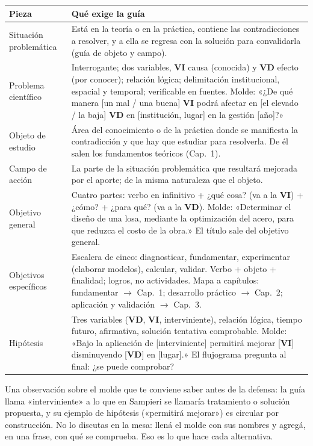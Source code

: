 \documentclass[11pt,a4paper]{article}
\newcommand{\vi}{\textbf{VI}}
\newcommand{\vd}{\textbf{VD}}
\newcommand{\molde}[1]{\textcolor{blue!60!black}{\small #1}}
\begin{document}
\begin{longtable}{L{3.4cm}L{12.4cm}}
\toprule
\textbf{Pieza} & \textbf{Qué exige la guía} \\
\midrule
\endhead
Situación problemática & Está en la teoría o en la práctica, contiene las contradicciones a resolver, y a ella se regresa con la solución para convalidarla (guía de objeto y campo). \\
Problema científico & Interrogante; dos variables, \vi{} causa (conocida) y \vd{} efecto (por conocer); relación lógica; delimitación institucional, espacial y temporal; verificable en fuentes. Molde: \molde{«¿De qué manera [un mal / una buena] \vi{} podrá afectar en [el elevado / la baja] \vd{} en [institución, lugar] en la gestión [año]?»} \\
Objeto de estudio & Área del conocimiento o de la práctica donde se manifiesta la contradicción y que hay que estudiar para resolverla. De él salen los fundamentos teóricos (Cap.~1). \\
Campo de acción & La parte de la situación problemática que resultará mejorada por el aporte; de la misma naturaleza que el objeto. \\
Objetivo general & Cuatro partes: verbo en infinitivo + ¿qué cosa? (va a la \vi) + ¿cómo? + ¿para qué? (va a la \vd). Molde: \molde{«Determinar el diseño de una losa, mediante la optimización del acero, para que reduzca el costo de la obra.»} El título sale del objetivo general. \\
Objetivos específicos & Escalera de cinco: diagnosticar, fundamentar, experimentar (elaborar modelos), calcular, validar. Verbo + objeto + finalidad; logros, no actividades. Mapa a capítulos: fundamentar $\to$ Cap.~1; desarrollo práctico $\to$ Cap.~2; aplicación y validación $\to$ Cap.~3. \\
Hipótesis & Tres variables (\vd, \vi, interviniente), relación lógica, tiempo futuro, afirmativa, solución tentativa comprobable. Molde: \molde{«Bajo la aplicación de [interviniente] permitirá mejorar [\vi] disminuyendo [\vd] en [lugar].»} El flujograma pregunta al final: ¿se puede comprobar? \\
\bottomrule
\end{longtable}

Una observación sobre el molde que te conviene saber antes de la defensa: la guía llama «interviniente» a lo que en Sampieri se llamaría tratamiento o solución propuesta, y su ejemplo de hipótesis («permitirá mejorar») es circular por construcción. No lo discutas en la mesa: llená el molde con sus nombres y agregá, en una frase, con qué se comprueba. Eso es lo que hace cada alternativa.
\end{document}
